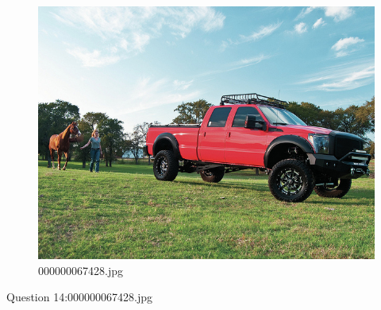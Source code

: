     \begin{figure}[h]
        \centering
        \includegraphics[width=0.8\linewidth]{../image set/easy/000000067428.jpg}
        \caption{000000067428.jpg}
    \end{figure}
    Question 14:000000067428.jpg
